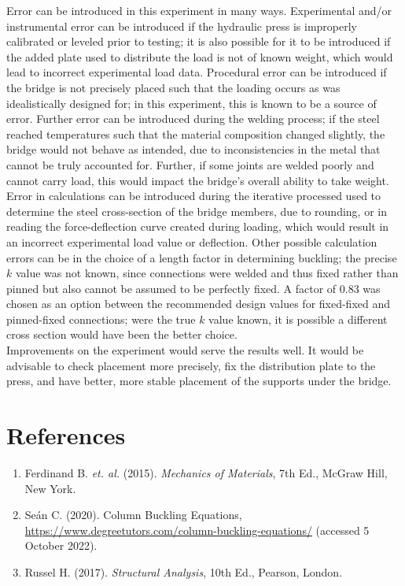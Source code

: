\documentclass{article}
\begin{document}
    \indent Error can be introduced in this experiment in many ways. Experimental and/or instrumental error can be introduced if the hydraulic press is improperly calibrated or leveled prior to testing; it is also possible for it to be introduced if the added plate used to distribute the load is not of known weight, which would lead to incorrect experimental load data. Procedural error can be introduced if the bridge is not precisely placed such that the loading occurs as was idealistically designed for; in this experiment, this is known to be a source of error. Further error can be introduced during the welding process; if the steel reached temperatures such that the material composition changed slightly, the bridge would not behave as intended, due to inconsistencies in the metal that cannot be truly accounted for. Further, if some joints are welded poorly and cannot carry load, this would impact the bridge's overall ability to take weight. Error in calculations can be introduced during the iterative processed used to determine the steel cross-section of the bridge members, due to rounding, or in reading the force-deflection curve created during loading, which would result in an incorrect experimental load value or deflection. Other possible calculation errors can be in the choice of a length factor in determining buckling; the precise \(k\) value was not known, since connections were welded and thus fixed rather than pinned but also cannot be assumed to be perfectly fixed. A factor of 0.83 was chosen as an option between the recommended design values for fixed-fixed and pinned-fixed connections; were the true \(k\) value known, it is possible a different cross section would have been the better choice.\\ 
    \indent Improvements on the experiment would serve the results well. It would be advisable to check placement more precisely, fix the distribution plate to the press, and have better, more stable placement of the supports under the bridge. 


    \newpage
    \section{References}
    \begin{enumerate}
        \item Ferdinand B. \emph{et. al.} (2015). \emph{Mechanics of Materials}, 7th Ed., McGraw Hill, New York.
        \item Seán C. (2020). Column Buckling Equations, \url{https://www.degreetutors.com/column-buckling-equations/} (accessed 5 October 2022).
        \item Russel H. (2017). \emph{Structural Analysis}, 10th Ed., Pearson, London.
    \end{enumerate}
    \newpage
\end{document}
